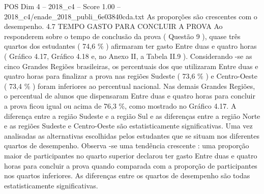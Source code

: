 \begin{textsample}{POS Dim 4 – 2018\_c4 – Score 1.00 – 2018\_c4/enade\_2018\_publi\_6e03840cda.txt}
As proporções são crescentes com o desempenho. 4.7 TEMPO GASTO PARA CONCLUIR A PROVA Ao responderem sobre o tempo de conclusão da prova ( Questão 9 ), quase três quartos dos estudantes ( 74,6 \% ) afirmaram ter gasto Entre duas e quatro horas ( Gráfico 4.17, Gráfico 4.18 e, no Anexo II, a Tabela II.9 ).
Considerando -se as cinco Grandes Regiões brasileiras, os percentuais dos que utilizaram Entre duas e quatro horas para finalizar a prova nas regiões Sudeste ( 73,6 \% ) e Centro-Oeste ( 73,4 \% ) foram inferiores ao percentual nacional.
Nas demais Grandes Regiões, o percentual de alunos que dispensaram Entre duas e quatro horas para concluir a prova ficou igual ou acima de 76,3 \%, como mostrado no Gráfico 4.17.
A diferença entre a região Sudeste e a região Sul e as diferenças entre a região Norte e as regiões Sudeste e Centro-Oeste são estatisticamente significativas.
Uma vez analisadas as alternativas escolhidas pelos estudantes que se situam nos diferentes quartos de desempenho.
Observa -se uma tendência crescente : uma proporção maior de participantes no quarto superior declarou ter gasto Entre duas e quatro horas para concluir a prova quando comparada com a proporção de participantes nos quartos inferiores.
As diferenças entre os quartos de desempenho são todas estatisticamente significativas.

\end{textsample}
